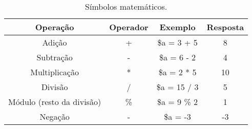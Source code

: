 \begin{table}[H]
\caption{Símbolos matemáticos.}\label{tab:cap4-operadores-aritmeticos}
\begin{center}
\begin{tabular}{|c|c|c|c|}
\hline
  \multicolumn{1}{|c|}{ \textbf{Operação}}
&  \multicolumn{1}{|c|}{ \textbf{Operador}} 
&  \multicolumn{1}{|c|}{ \textbf{Exemplo}} 
&  \multicolumn{1}{|c|}{ \textbf{Resposta}} \\
\hline
\hline
Adição                    & + & \$a = 3 + 5 & 8   \\ \hline
Subtração                 & - & \$a = 6 - 2 & 4   \\ \hline
Multiplicação             & * & \$a = 2 * 5 & 10  \\ \hline
Divisão                   & / & \$a = 15 / 3 & 5  \\ \hline
Módulo (resto da divisão) & \% & \$a = 9 \% 2 & 1  \\ \hline
Negação                   & - & \$a = -3 & -3  \\ \hline
\end{tabular}
\end{center}
\end{table}
